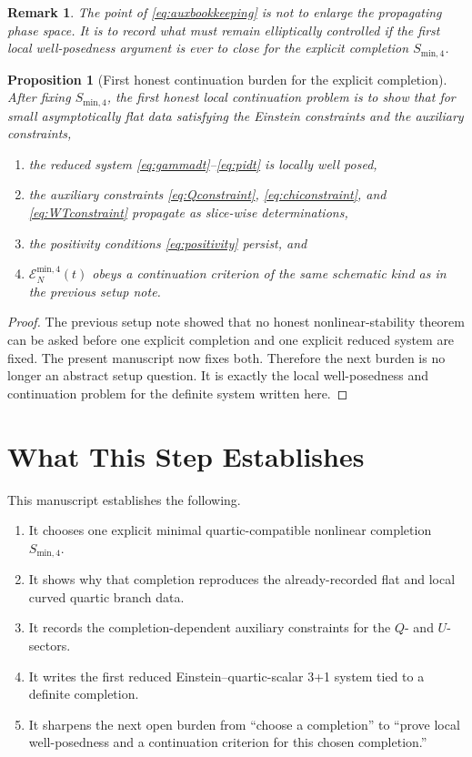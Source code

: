 \documentclass[11pt]{article}
\newtheorem{proposition}{Proposition}
\newtheorem{remark}{Remark}
\begin{document}
\begin{remark}
The point of \eqref{eq:auxbookkeeping} is not to enlarge the propagating phase space. It is to record what must remain elliptically controlled if the first local well-posedness argument is ever to close for the explicit completion \(S_{\mathrm{min},4}\).
\end{remark}

\begin{proposition}[First honest continuation burden for the explicit completion]
After fixing \(S_{\mathrm{min},4}\), the first honest local continuation problem is to show that for small asymptotically flat data satisfying the Einstein constraints and the auxiliary constraints,
\begin{enumerate}
    \item the reduced system \eqref{eq:gammadt}--\eqref{eq:pidt} is locally well posed,
    \item the auxiliary constraints \eqref{eq:Qconstraint}, \eqref{eq:chiconstraint}, and \eqref{eq:WTconstraint} propagate as slice-wise determinations,
    \item the positivity conditions \eqref{eq:positivity} persist, and
    \item \(\mathcal E_N^{\mathrm{min},4}(t)\) obeys a continuation criterion of the same schematic kind as in the previous setup note.
\end{enumerate}
\end{proposition}

\begin{proof}
The previous setup note showed that no honest nonlinear-stability theorem can be asked before one explicit completion and one explicit reduced system are fixed. The present manuscript now fixes both. Therefore the next burden is no longer an abstract setup question. It is exactly the local well-posedness and continuation problem for the definite system written here.
\end{proof}

\section{What This Step Establishes}

This manuscript establishes the following.
\begin{enumerate}
    \item It chooses one explicit minimal quartic-compatible nonlinear completion \(S_{\mathrm{min},4}\).
    \item It shows why that completion reproduces the already-recorded flat and local curved quartic branch data.
    \item It records the completion-dependent auxiliary constraints for the \(Q\)- and \(U\)-sectors.
    \item It writes the first reduced Einstein--quartic-scalar 3+1 system tied to a definite completion.
    \item It sharpens the next open burden from ``choose a completion'' to ``prove local well-posedness and a continuation criterion for this chosen completion.''
\end{enumerate}
\end{document}
